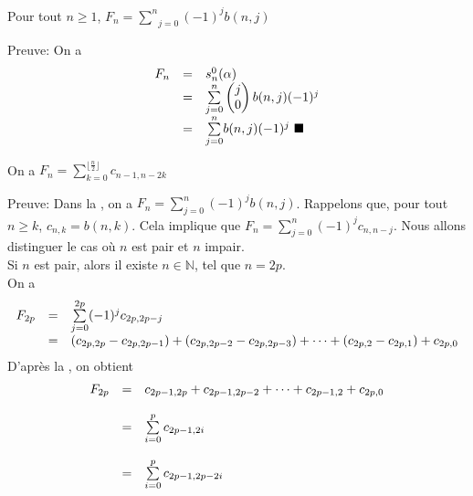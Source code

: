 \begin{proposition} \label{fnbnk}
	Pour tout $ n\geq 1$, $F_{n}=\underset{j=0}{\overset{n}{\sum}}(-1)^{j}b(n,j)$
\end{proposition}
Preuve: On a
\[
	\begin{array}{l l l}
		F_{n} & = & s_{n}^{0}(\alpha) \\&=&\underset{j=0}{\overset{n}{\sum}}\begin{pmatrix} j\\0\end{pmatrix}b(n,j)(-1)^{j}\\&=&\underset{j=0}{\overset{n}{\sum}}b(n,j)(-1)^{j}\text{ }\blacksquare
	\end{array}
\]
\begin{proposition}\label{p12}
	On a $F_{n} = \sum\limits_{k=0}^{\lfloor \frac{n}{2} \rfloor}c_{n-1, n-2k}$
\end{proposition}
Preuve: Dans la , on a $F_{n} = \sum\limits_{j=0}^{n}(-1)^{j}b(n, j)$. Rappelons que, pour tout $n\geq k$, $c_{n, k} = b(n, k)$. Cela implique que $F_{n}=\sum\limits_{j=0}^{n}(-1)^{j}c_{n, n-j}$. Nous allons distinguer le cas où $n$ est pair et $n$ impair.\vspace{5pt}\\
	Si $n$ est pair, alors il existe $n \in \mathbb{N}$, tel que $n=2p$. \\
	On a
	\[
		\begin{array}{l l l }
			F_{2p}&=&\sum\limits_{j=0}^{2p}(-1)^{j}c_{2p, 2p-j}\\
			&=&(c_{2p, 2p} - c_{2p, 2p-1}) + (c_{2p, 2p-2} - c_{2p, 2p-3})+ \cdots + (c_{2p, 2} - c_{2p, 1}) + c_{2p, 0}
		\end{array}
	\]
	D'après la , on obtient
	\[
		\begin{array}{l l l}
			F_{2p} & =        & c_{2p-1, 2p} + c_{2p-1, 2p-2} + \cdots + c_{2p-1, 2} + c_{2p, 0} \\
			       & \text{ } &                                                                  \\
			       & =        & \sum\limits_{i=0}^{p}c_{2p-1,2i}                                 \\
			       & \text{ } &                                                                  \\
			       & =        & \sum\limits_{i=0}^{p}c_{2p-1, 2p-2i}
		\end{array}
	\]
	\text{ }\vspace{5pt}\\
